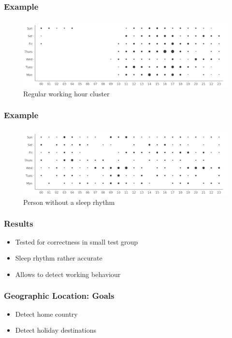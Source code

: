 \documentclass[t]{beamer}
\begin{document}
\begin{frame}
    \frametitle{Example}
    \vspace{1cm}
    \begin{figure}[H]
        \includegraphics[scale=0.22]{analysis/ordered-punchcard}
        \centering
        \caption{Regular working hour cluster}
    \end{figure}
\end{frame}

\begin{frame}
    \frametitle{Example}
    \vspace{1cm}
    \begin{figure}[H]
        \includegraphics[scale=0.22]{analysis/random-punchcard}
        \centering
        \caption{Person without a sleep rhythm}
    \end{figure}
\end{frame}

\begin{frame}
    \frametitle{Results}
    \begin{itemize}
        \item Tested for correctness in small test group
        \pause{}
        \item Sleep rhythm rather accurate
        \pause{}
        \item Allows to detect working behaviour
    \end{itemize}
\end{frame}

\begin{frame}
    \frametitle{Geographic Location: Goals}
    \vspace{1cm}
    \begin{itemize}
        \item Detect home country
        \pause{}
        \item Detect holiday destinations
    \end{itemize}
\end{frame}
\end{document}
